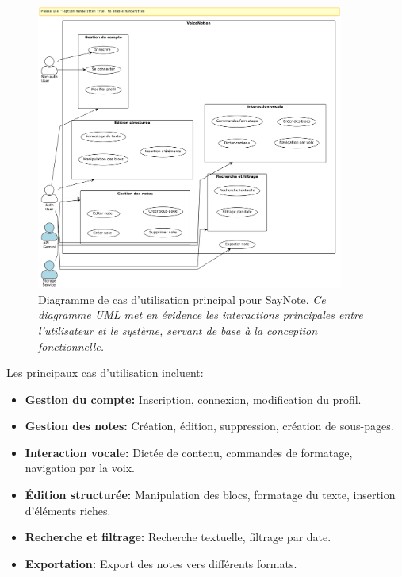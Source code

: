         \begin{figure}[htbp]
        \centering
        \includegraphics[width=0.9\textwidth]{assets/docs/SayNote_use_case.png}
        \caption{Diagramme de cas d'utilisation principal pour SayNote. \newline\textit{Ce diagramme UML met en évidence les interactions principales entre l'utilisateur et le système, servant de base à la conception fonctionnelle.}}
        \label{fig:use_case_diagram}
    \end{figure}
    
    Les principaux cas d'utilisation incluent:
    
    \begin{itemize}
        \item \textbf{Gestion du compte:} Inscription, connexion, modification du profil.
        
        \item \textbf{Gestion des notes:} Création, édition, suppression, création de sous-pages.
        
        \item \textbf{Interaction vocale:} Dictée de contenu, commandes de formatage, navigation par la voix.
        
        \item \textbf{Édition structurée:} Manipulation des blocs, formatage du texte, insertion d'éléments riches.
        
        \item \textbf{Recherche et filtrage:} Recherche textuelle, filtrage par date.
        
        \item \textbf{Exportation:} Export des notes vers différents formats.
    \end{itemize}
    
